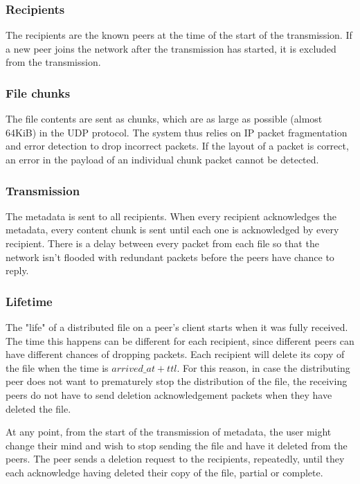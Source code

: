 \documentclass[a4paper, 12pt]{report}
\begin{document}
\subsubsection{Recipients}
The recipients are the known peers at the time of the start of the transmission. If a new peer joins the network after the transmission has started, it is excluded from the transmission.

\subsubsection{File chunks}
The file contents are sent as chunks, which are as large as possible (almost 64KiB) in the UDP protocol. The system thus relies on IP packet fragmentation and error detection to drop incorrect packets. If the layout of a packet is correct, an error in the payload of an individual chunk packet cannot be detected.

\subsubsection{Transmission}
The metadata is sent to all recipients. When every recipient acknowledges the metadata, every content chunk is sent until each one is acknowledged by every recipient. There is a delay between every packet from each file so that the network isn't flooded with redundant packets before the peers have chance to reply.

\subsubsection{Lifetime}
The "life" of a distributed file on a peer's client starts when it was fully received. The time this happens can be different for each recipient, since different peers can have different chances of dropping packets. Each recipient will delete its copy of the file when the time is ${arrived\_at + ttl}$. For this reason, in case the distributing peer does not want to prematurely stop the distribution of the file, the receiving peers do not have to send deletion acknowledgement packets when they have deleted the file.

At any point, from the start of the transmission of metadata, the user might change their mind and wish to stop sending the file and have it deleted from the peers. The peer sends a deletion request to the recipients, repeatedly, until they each acknowledge having deleted their copy of the file, partial or complete.
\end{document}
